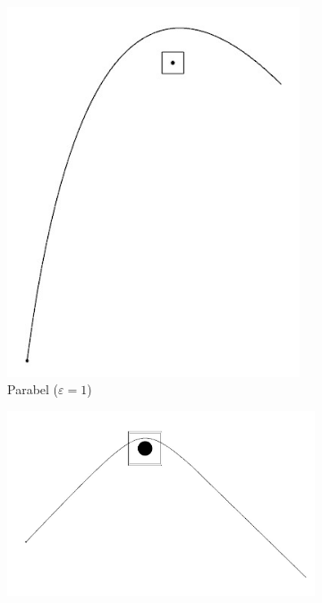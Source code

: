     \begin{figure}[h]
      \center
      \begin{subfigure}[b]{0.49\textwidth}
        \center
        \includegraphics[width=0.95\textwidth]{pictures/two_body/parabel.jpg}
        \caption{Parabel ($\varepsilon=1$)}
      \end{subfigure}
      \begin{subfigure}[b]{0.49\textwidth}
        \center
        \includegraphics[height=0.95\textwidth,angle=90]{pictures/two_body/hyperbol.jpg}

\end{subfigure}
\end{figure}
